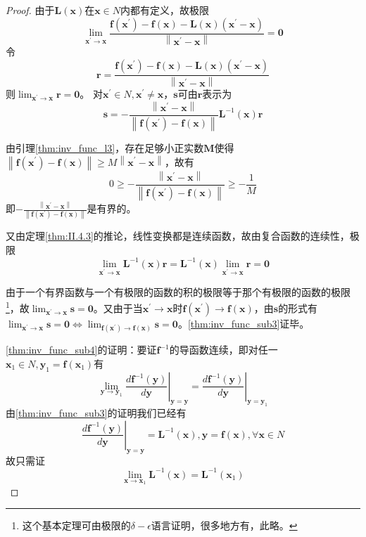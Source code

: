\documentclass[main.tex]{subfiles}
\begin{document}
\begin{proof}
    由于$\mathbf{L}\left(\mathbf{x}\right)$在$\mathbf{x}\in N$内都有定义，故极限
    \[\lim_{\mathbf{x}^\prime\to\mathbf{x}}\frac{\mathbf{f}\left(\mathbf{x}^\prime\right)-\mathbf{f}\left(\mathbf{x}\right)-\mathbf{L}\left(\mathbf{x}\right)\left(\mathbf{x}^\prime-\mathbf{x}\right)}{\left\|\mathbf{x}^\prime-\mathbf{x}\right\|}=\mathbf{0}\]
    令
    \[\mathbf{r}=\frac{\mathbf{f}\left(\mathbf{x}^\prime\right)-\mathbf{f}\left(\mathbf{x}\right)-\mathbf{L}\left(\mathbf{x}\right)\left(\mathbf{x}^\prime-\mathbf{x}\right)}{\left\|\mathbf{x}^\prime-\mathbf{x}\right\|}\]
    则$\lim_{\mathbf{x}^\prime\to\mathbf{x}}\mathbf{r}=\mathbf{0}$。
    对$\mathbf{x}^\prime\in N,\mathbf{x}^\prime\neq\mathbf{x}$，$\mathbf{s}$可由$\mathbf{r}$表示为
    \[
        \mathbf{s}=-\frac{\left\|\mathbf{x}^\prime-\mathbf{x}\right\|}{\left\|\mathbf{f}\left(\mathbf{x}^\prime\right)-\mathbf{f}\left(\mathbf{x}\right)\right\|}\mathbf{L}^{-1}\left(\mathbf{x}\right)\mathbf{r}
    \]

    由引理\ref{thm:inv_func_l3}，存在足够小正实数$\mathbf{M}$使得$\left\|\mathbf{f}\left(\mathbf{x}^\prime\right)-\mathbf{f}\left(\mathbf{x}\right)\right\|\geq M\left\|\mathbf{x}^\prime-\mathbf{x}\right\|$，故有
    \[0\geq-\frac{\left\|\mathbf{x}^\prime-\mathbf{x}\right\|}{\left\|\mathbf{f}\left(\mathbf{x}^\prime\right)-\mathbf{f}\left(\mathbf{x}\right)\right\|}\geq-\frac{1}{M}\]
    即$-\frac{\left\|\mathbf{x}^\prime-\mathbf{x}\right\|}{\left\|\mathbf{f}\left(\mathbf{x}^\prime\right)-\mathbf{f}\left(\mathbf{x}\right)\right\|}$是有界的。

    又由定理\ref{thm:II.4.3}的推论，线性变换都是连续函数，故由复合函数的连续性，极限
    \[\lim_{\mathbf{x}^\prime\to\mathbf{x}}\mathbf{L}^{-1}\left(\mathbf{x}\right)\mathbf{r}=\mathbf{L}^{-1}\left(\mathbf{x}\right)\lim_{\mathbf{x}^\prime\to\mathbf{x}}\mathbf{r}=\mathbf{0}\]

    由于一个有界函数与一个有极限的函数的积的极限等于那个有极限的函数的极限\footnote{这个基本定理可由极限的$\delta-\epsilon$语言证明，很多地方有，此略。}，故$\lim_{\mathbf{x}^\prime\to\mathbf{x}}\mathbf{s}=\mathbf{0}$。又由于当$\mathbf{x}^\prime\to\mathbf{x}$时$\mathbf{f}\left(\mathbf{x}^\prime\right)\to\mathbf{f}\left(\mathbf{x}\right)$，由$\mathbf{s}$的形式有$\lim_{\mathbf{x}^\prime\to\mathbf{x}}\mathbf{s}=\mathbf{0}\Leftrightarrow\lim_{\mathbf{f}\left(\mathbf{x}^\prime\right)\to\mathbf{f}\left(\mathbf{x}\right)}\mathbf{s}=\mathbf{0}$。\ref{thm:inv_func_sub3}证毕。

    \ref{thm:inv_func_sub4}的证明：要证$\mathbf{f}^{-1}$的导函数连续，即对任一$\mathbf{x}_1\in N, \mathbf{y}_1=\mathbf{f}\left(\mathbf{x}_1\right)$有
    \[\lim_{\mathbf{y}\to\mathbf{y}_1}\left.\frac{d\mathbf{f}^{-1}\left(\mathbf{y}\right)}{d\mathbf{y}}\right|_{\mathbf{y}=\mathbf{y}}=\left.\frac{d\mathbf{f}^{-1}\left(\mathbf{y}\right)}{d\mathbf{y}}\right|_{\mathbf{y}=\mathbf{y}_1}\]
    由\ref{thm:inv_func_sub3}的证明我们已经有
    \[
        \left.\frac{d\mathbf{f}^{-1}\left(\mathbf{y}\right)}{d\mathbf{y}}\right|_{\mathbf{y}=\mathbf{y}}=\mathbf{L}^{-1}\left(\mathbf{x}\right),\mathbf{y}=\mathbf{f}\left(\mathbf{x}\right),\forall\mathbf{x}\in N\]
    故只需证
    \[\lim_{\mathbf{x}\to\mathbf{x}_1}\mathbf{L}^{-1}\left(\mathbf{x}\right)=\mathbf{L}^{-1}\left(\mathbf{x}_1\right)\]


\end{proof}
\end{document}
